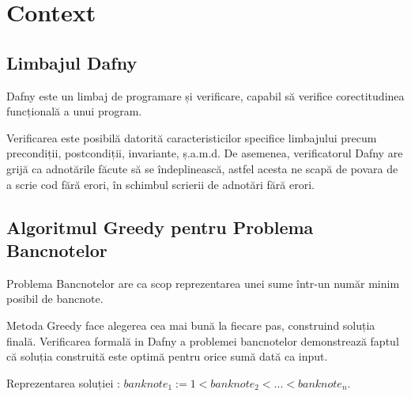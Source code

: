 
\chapter{Context} 

\section{Limbajul Dafny} 
Dafny este un limbaj de programare și verificare, capabil să verifice corectitudinea
 funcțională a unui program.\par
Verificarea este posibilă datorită caracteristicilor specifice limbajului precum precondiții, postcondiții, 
invariante, ș.a.m.d. De asemenea, verificatorul Dafny are grijă ca adnotările făcute să se îndeplinească,
astfel acesta ne scapă de povara de a scrie cod fără erori, în schimbul scrierii de adnotări fără erori.

\section{Algoritmul Greedy pentru Problema Bancnotelor} 
Problema Bancnotelor are ca scop reprezentarea unei sume într-un număr minim posibil de bancnote.\par
Metoda Greedy face alegerea cea mai bună la fiecare pas, construind soluția finală.
Verificarea formală in Dafny a problemei bancnotelor demonstrează faptul că soluția construită este optimă
pentru orice sumă dată ca input. \par
Reprezentarea soluției :
$ banknote_{1}:= 1 < banknote_{2} < ... < banknote_{n} $. 


